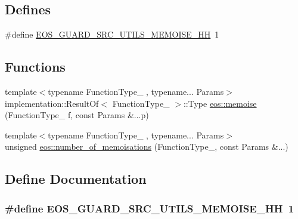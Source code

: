 \subsection*{Defines}
\begin{DoxyCompactItemize}
\item 
\#define \hyperlink{memoise_8hh_a634782acc6719bb8865b60fcff17148e}{EOS\_\-GUARD\_\-SRC\_\-UTILS\_\-MEMOISE\_\-HH}~1
\end{DoxyCompactItemize}
\subsection*{Functions}
\begin{DoxyCompactItemize}
\item 
{\footnotesize template$<$typename FunctionType\_\- , typename... Params$>$ }\\implementation::ResultOf$<$ FunctionType\_\- $>$::Type \hyperlink{namespaceeos_a145cd9427e62a28f1144614e2b9a3d7d}{eos::memoise} (FunctionType\_\- f, const Params \&...p)
\item 
{\footnotesize template$<$typename FunctionType\_\- , typename... Params$>$ }\\unsigned \hyperlink{namespaceeos_a82ca3bc4794ddeca0b97d4a66fa5a679}{eos::number\_\-of\_\-memoisations} (FunctionType\_\-, const Params \&...)
\end{DoxyCompactItemize}


\subsection{Define Documentation}
\hypertarget{memoise_8hh_a634782acc6719bb8865b60fcff17148e}{
\subsubsection[{EOS\_\-GUARD\_\-SRC\_\-UTILS\_\-MEMOISE\_\-HH}]{\setlength{\rightskip}{0pt plus 5cm}\#define EOS\_\-GUARD\_\-SRC\_\-UTILS\_\-MEMOISE\_\-HH~1}}
\label{memoise_8hh_a634782acc6719bb8865b60fcff17148e}
